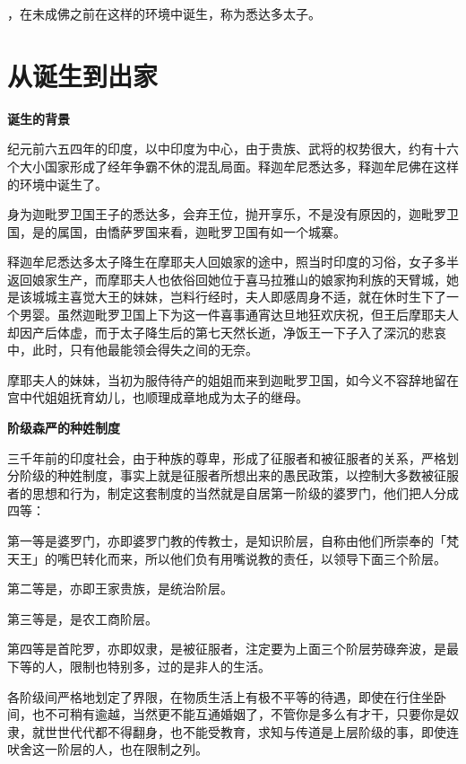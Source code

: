 \documentclass[12pt,twoside,openany]{book}
\newcommand{\mt}[1]{\textbullet \textbf{#1}}
\begin{document}
，在未成佛之前在这样的环境中诞生，称为悉达多太子。
	
\newpage
\section{从诞生到出家}\label{sec1.1}

\mt{诞生的背景}

纪元前六五四年的印度，以中印度为中心，由于贵族、武将的权势很大，约有十六个大小国家形成了经年争霸不休的混乱局面。释迦牟尼\textperiodcentered 悉达多，释迦牟尼佛在这样的环境中诞生了。

身为迦毗罗卫国王子的悉达多，会弃王位，抛开享乐，不是没有原因的，迦毗罗卫国，是的属国，由憍萨罗国来看，迦毗罗卫国有如一个城寨。

释迦牟尼\textperiodcentered 悉达多太子降生在摩耶夫人回娘家的途中，照当时印度的习俗，女子多半返回娘家生产，而摩耶夫人也依俗回她位于喜马拉雅山的娘家拘利族的天臂城，她是该城城主喜觉大王的妹妹，岂料行经时，夫人即感周身不适，就在休时生下了一个男婴。虽然迦毗罗卫国上下为这一件喜事通宵达旦地狂欢庆祝，但王后摩耶夫人却因产后体虚，而于太子降生后的第七天然长逝，净饭王一下子入了深沉的悲哀中，此时，只有他最能领会得失之间的无奈。

摩耶夫人的妹妹，当初为服侍待产的姐姐而来到迦毗罗卫国，如今义不容辞地留在宫中代姐姐抚育幼儿，也顺理成章地成为太子的继母。

\mt{阶级森严的种姓制度}

三千年前的印度社会，由于种族的尊卑，形成了征服者和被征服者的关系，严格划分阶级的种姓制度，事实上就是征服者所想出来的愚民政策，以控制大多数被征服者的思想和行为，制定这套制度的当然就是自居第一阶级的婆罗门，他们把人分成四等：

第一等是婆罗门，亦即婆罗门教的传教士，是知识阶层，自称由他们所崇奉的「梵天王」的嘴巴转化而来，所以他们负有用嘴说教的责任，以领导下面三个阶层。

第二等是，亦即王家贵族，是统治阶层。

第三等是，是农工商阶层。

第四等是首陀罗，亦即奴隶，是被征服者，注定要为上面三个阶层劳碌奔波，是最下等的人，限制也特别多，过的是非人的生活。

各阶级间严格地划定了界限，在物质生活上有极不平等的待遇，即使在行住坐卧间，也不可稍有逾越，当然更不能互通婚姻了，不管你是多么有才干，只要你是奴隶，就世世代代都不得翻身，也不能受教育，求知与传道是上层阶级的事，即使连吠舍这一阶层的人，也在限制之列。
\end{document}
